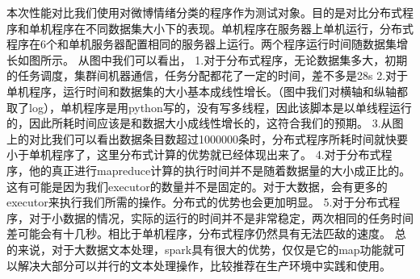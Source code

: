 \documentclass[12pt, oneside]{article}
\begin{document}
\begin{spacing}{1.5}
\begin{CJK}{UTF8}{gbsn}
本次性能对比我们使用对微博情绪分类的程序作为测试对象。目的是对比分布式程序和单机程序在不同数据集大小下的表现。单机程序在服务器上单机运行，分布式程序在6个和单机服务器配置相同的服务器上运行。两个程序运行时间随数据集增长如图所示。
从图中我们可以看出，
1.对于分布式程序，无论数据集多大，初期的任务调度，集群间机器通信，任务分配都花了一定的时间，差不多是28s
2.对于单机程序，运行时间和数据集的大小基本成线性增长。（图中我们对横轴和纵轴都取了log），单机程序是用python写的，没有写多线程，因此该脚本是以单线程运行的，因此所耗时间应该是和数据大小成线性增长的，这符合我们的预期。
3.从图上的对比我们可以看出数据条目数超过1000000条时，分布式程序所耗时间就快要小于单机程序了，这里分布式计算的优势就已经体现出来了。
4.对于分布式程序，他的真正进行mapreduce计算的执行时间并不是随着数据量的大小成正比的。这有可能是因为我们executor的数量并不是固定的。对于大数据，会有更多的executor来执行我们所需的操作。分布式的优势也会更加明显。
5.对于分布式程序，对于小数据的情况，实际的运行的时间并不是非常稳定，两次相同的任务时间差可能会有十几秒。相比于单机程序，分布式程序仍然具有无法匹敌的速度。
总的来说，对于大数据文本处理，spark具有很大的优势，仅仅是它的map功能就可以解决大部分可以并行的文本处理操作，比较推荐在生产环境中实践和使用。

\newpage
\renewcommand\refname{参考文献}



\end{CJK}
\end{spacing}
\end{document}
